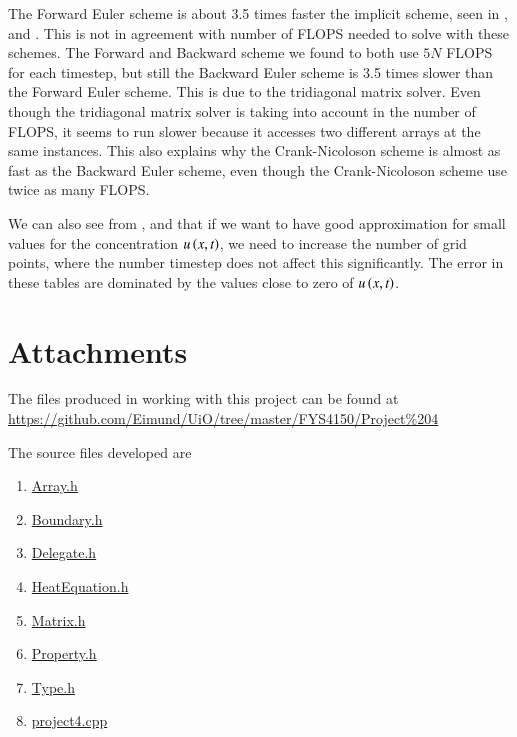 \documentclass[11pt,english,a4paper]{article}
\begin{document}
\begin{flushleft}
The Forward Euler scheme is about 3.5 times faster the implicit scheme, seen in ,  and . This is not in agreement with number of FLOPS needed to solve with these schemes. The Forward and Backward scheme we found to both use $5N$ FLOPS for each timestep, but still the Backward Euler scheme is 3.5 times slower than the Forward Euler scheme. This is due to the tridiagonal matrix solver. Even though the tridiagonal matrix solver is taking into account in the number of FLOPS, it seems to run slower because it accesses two different arrays at the same instances. This also explains why the Crank-Nicoloson scheme is almost as fast as the Backward Euler scheme, even though the Crank-Nicoloson scheme use twice as many FLOPS. \linebreak

We can also see from ,  and  that if we want to have good approximation for small values for the concentration $u\left({x,t}\right)$, we need to increase the number of grid points, where the number timestep does not affect this significantly. The error in these tables are dominated by the values close to zero of $u\left({x,t}\right)$.

\section{Attachments}

The files produced in working with this project can be found at  \href{https://github.com/Eimund/UiO/tree/master/FYS4150/Project\%204}{https://github.com/Eimund/UiO/tree/master/FYS4150/Project\%204}\linebreak

The source files developed are

\begin{enumerate}
\item{\href{https://github.com/Eimund/UiO/blob/master/FYS4150/Project\%204/project4/Array.h}{Array.h}}
\item{\href{https://github.com/Eimund/UiO/blob/master/FYS4150/Project\%204/project4/Boundary.h}{Boundary.h}}
\item{\href{https://github.com/Eimund/UiO/blob/master/FYS4150/Project\%204/project4/Delegate.h}{Delegate.h}}
\item{\href{https://github.com/Eimund/UiO/blob/master/FYS4150/Project\%204/project4/HeatEquation.h}{HeatEquation.h}}
\item{\href{https://github.com/Eimund/UiO/blob/master/FYS4150/Project\%204/project4/Matrix.h}{Matrix.h}}
\item{\href{https://github.com/Eimund/UiO/blob/master/FYS4150/Project\%204/project4/Property.h}{Property.h}}
\item{\href{https://github.com/Eimund/UiO/blob/master/FYS4150/Project\%204/project4/Type.h}{Type.h}}
\item{\href{https://github.com/Eimund/UiO/blob/master/FYS4150/Project\%204/project4/project4.cpp}{project4.cpp}}
\end{enumerate}



\end{flushleft}
\end{document}
